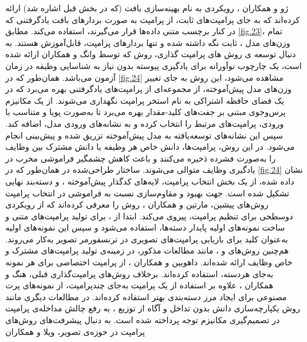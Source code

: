 ژو و همکاران 
\cite{CoOp}،
رویکردی به نام بهینه‌سازی بافت 
(که در بخش قبل اشاره شد) ارائه کرده‌اند که به جای پرامپت‌های ثابت، از پرامپت به صورت بردارهای بافت یادگرفتنی
که در کنار برچسب متنی داده‌ها قرار می‌گیرند، استفاده می‌کند. مطابق 
\cref{fig.23}،
تمام وزن‌های مدل 
،
ثابت نگه داشته شده و تنها بردارهای پرامپت، قابل‌آموزش هستند. به دنبال توسعه ی روش های پرامپت گذاری، روش
که توسط وانگ و همکاران
\cite{l2p}
ارائه شده است، یک چارچوب نوآورانه برای یادگیری پیوسته بدون نیاز به شناسایی وظیفه در زمان آزمون می‌باشد. همان‌طور که در 
\cref{fig.24}
مشاهده می‌شود، این روش به جای تغییر وزن‌های مدل پیش‌آموخته، از مجموعه‌ای از پرامپت‌های یادگرفتنی بهره می‌برد که در یک فضای حافظه اشتراکی به نام استخر پرامپت نگهداری می‌شوند. 
از یک مکانیزم پرس‌وجوی مبتنی بر جفت‌های کلید-مقدار بهره می‌برد تا به‌صورت پویا و متناسب با ورودی، پرامپت‌های مرتبط را انتخاب کرده و به نشانه‌‌های ورودی مدل، اضافه کند. سپس این نشانه‌‌های توسعه‌یافته به مدل پیش‌آموخته تزریق شده و پیش‌بینی انجام می‌شود.
در این روش، پرامپت‌ها، دانش خاص هر وظیفه یا دانش مشترک بین وظایف را به‌صورت فشرده ذخیره می‌کنند و باعث کاهش چشمگیر فراموشی مخرب در یادگیری وظایف متوالی می‌شوند. ساختار طراحی‌شده در  
همان‌طور که در 
\cref{fig.24}
نشان داده شده، از یک بخش انتخاب پرامپت، لایه‌های کدگذار پیش‌آموخته
،
و دسته‌بند نهایی تشکیل شده است. جهت بهبود و مقاوم‌سازی نسبت به فراموشی در انتخاب پرامپت روش‌های پیشین، مارتین و همکاران
\cite{starprompt}،
روش 
را معرفی کرده‌اند که از رویکردی دوسطحی برای تنظیم پرامپت، پیروی می‌کند. ابتدا از 
،
برای تولید پرامپت‌های متنی و ساخت نمونه‌های‌ اولیه
پایدار دسته‌ها، استفاده می‌شود و سپس این نمونه‌های اولیه به‌عنوان کلید برای بازیابی پرامپت‌های تصویری در ترنسفورمر تصویر به‌کار می‌روند. هم‌چنین روش‌های
\cite{dual-prompt}
و 
\cite{h-prompts}،
مانند مطالعات مذکور، در زمینه‌ی تولید پرامپت‌های مشترک و خاص وظایف ارائه شده‌اند. داهویین و همکاران
\cite{instance_prompt}،
از پرامپت اختصاصی برای هر نمونه به‌جای هر‌دسته، استفاده کرده‌اند. برخلاف روش‌های پرامپت‌گذاری قبلی، هنگ و همکاران
\cite{ovor}،
علاوه بر استفاده از یک پرامپت به‌جای چندپرامپت، از نمونه‌های پرت مصنوعی برای ایجاد مرز دسته‌بندی بهتر استفاده کرده‌اند. در مطالعات دیگری مانند روش یکپارچه‌سازی دانش بدون تداخل و آگاه از توزیع
\cite{diki}
،
به رفع چالش مداخله‌ی پرامپت در تصمیم‌گیری مکانیزم توجه پرداخته شده است. به دنبال پیشرفت‌های روش‌های پرامپت در حوزه‌ی تصویر، ویلا و همکاران
